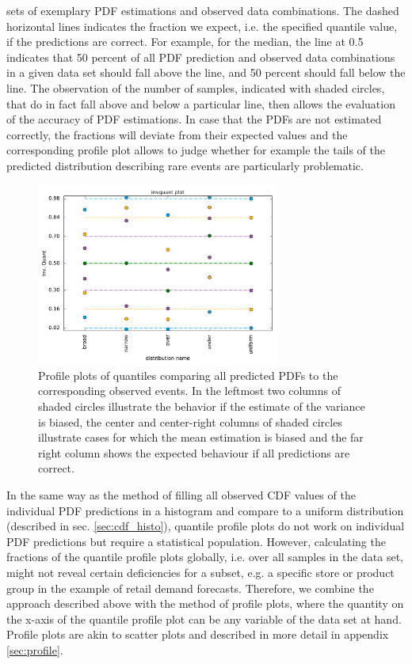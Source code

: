 \documentclass[BCOR=1mm, DIV=calc,10pt,
twoside=true,
twocolumn,
headings=normal]{scrartcl}
\begin{document}
sets of exemplary PDF estimations and observed data combinations. The dashed horizontal lines indicates the fraction we expect, i.e. the specified quantile value, if the predictions are correct. For example, for the median, the line at 0.5 indicates that  50 percent of all PDF prediction and observed data combinations in a given data set should fall above the line, and 50 percent should fall below the line. The observation of the number of samples, indicated with shaded circles, that do in fact fall above and below a particular line, then allows the evaluation of the accuracy of PDF estimations. In case that the PDFs are not estimated correctly, the fractions will deviate from their expected values and the corresponding profile plot allows to judge whether for example the tails of the predicted distribution describing rare events are particularly problematic.

\begin{figure}
\begin{center}
\includegraphics[width=8cm]{../figures/invquant_profiles}
\caption{\label{fig:quant_profiles} Profile plots of quantiles comparing all predicted PDFs to the corresponding observed events. In the leftmost two columns of shaded circles illustrate the behavior if the estimate of the variance is biased, the center and center-right columns of shaded circles illustrate cases for which the mean estimation is biased and the far right column shows the expected behaviour if all predictions are correct.}
\end{center}
\end{figure}

In the same way as the method of filling all observed CDF values of the individual PDF predictions in a histogram and compare to a uniform distribution (described in sec. \ref{sec:cdf_histo}), quantile profile plots do not work on individual PDF predictions but require a statistical population. However, calculating the fractions of the quantile profile plots globally, i.e. over all samples in the data set, might not reveal certain deficiencies for a subset, e.g. a specific store or product group in the example of retail demand forecasts. Therefore, we combine the approach described above with the method of profile plots, where the quantity on the x-axis of the quantile profile plot can be any variable of the data set at hand. Profile plots are akin to scatter plots and described in more detail in appendix \ref{sec:profile}.
\end{document}
